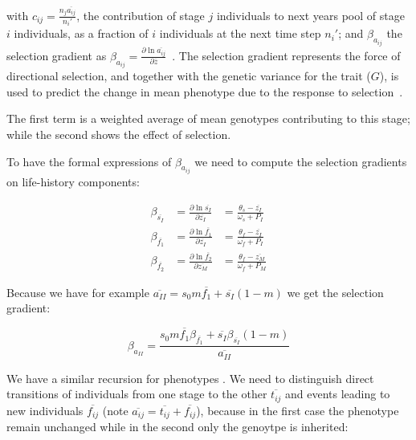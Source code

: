 with $c_{ij} = \frac{n_j \overline{a_{ij}}}{n_i'}$, the contribution of stage $j$ individuals to next years pool of stage $i$ individuals, as a fraction of $i$ individuals at the next time step $n_i'$; and $\beta_{a_{ij}}$ the selection gradient as $\beta_{a_{ij}} = \frac{\partial \ln \overline{a_{ij}}}{\partial \overline{z}}$~\citep{barfield_evolution_2011}. The selection gradient represents the force of directional selection, and together with the genetic variance for the trait ($G$), is used to predict the change in mean phenotype due to the response to selection~\citep{lande_quantitative_1982}.

The first term is a weighted average of mean genotypes contributing to this stage; while the second shows the effect of selection.

To have the formal expressions of $\beta_{a_{ij}}$ we need to compute the selection gradients on life-history components:

\begin{equation}
	\label{eq:selgradlfh}
	\begin{aligned}
	\beta_{\overline{s_I}} &= \frac{\partial \ln \overline{s_I}}{\partial \overline{z_I}} &= \frac{\theta_s - \overline{z_I}}{\omega_s + P_I} \\
	\beta_{\overline{f_1}} &= \frac{\partial \ln \overline{f_1}}{\partial \overline{z_I}} &= \frac{\theta_f - \overline{z_I}}{\omega_f + P_I} \\
	\beta_{\overline{f_2}} &= \frac{\partial \ln \overline{f_2}}{\partial \overline{z_M}} &= \frac{\theta_f - \overline{z_M}}{\omega_f + P_M}
	\end{aligned}
\end{equation}

Because we have for example $\overline{a_{II}} = s_0 m \overline{f_1} + \overline{s_I} (1-m)$ we get the selection gradient:

\begin{equation}
	\label{eq:selgradaII}
	\beta_{a_{II}} = \frac{s_0 m \overline{f_1} \beta_{\overline{f_1}} + \overline{s_I} \beta_{\overline{s_I}} (1-m)}{\overline{a_{II}}}
\end{equation}

We have a similar recursion for phenotypes \citep{barfield_evolution_2011}. We need to distinguish direct transitions of individuals from one stage to the other $\overline{t_{ij}}$ and events leading to new individuals $\overline{f_{ij}}$ (note $\overline{a_{ij}} = \overline{t_{ij}} + \overline{f_{ij}}$), because in the first case the phenotype remain unchanged while in the second only the genoytpe is inherited:

